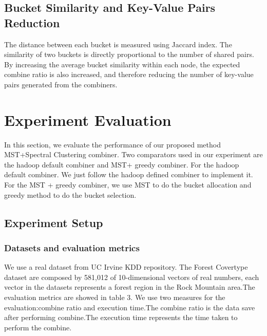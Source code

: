 \documentclass{vldb}
\begin{document}
\subsection{Bucket Similarity and Key-Value Pairs Reduction}
The distance between each bucket is measured using Jaccard index. The similarity of two buckets is directly proportional to the number of shared pairs. By increasing the average bucket similarity within each node, the expected combine ratio is also increased, and therefore reducing the number of key-value pairs generated from the combiners.
\section{Experiment Evaluation}
In this section, we evaluate the performance of our proposed method MST+Spectral Clustering combiner. Two comparators used in our experiment are the hadoop default combiner and MST+ greedy combiner. For the hadoop default combiner. We just follow the hadoop defined combiner to implement it. For the MST + greedy combiner, we use MST to do the bucket allocation and greedy method to do the bucket selection.
\subsection{Experiment Setup}
\subsubsection{Datasets and evaluation metrics}
We use a real dataset from UC Irvine KDD repository. The Forest Covertype dataset are composed by 581,012 of 10-dimensional vectors of real numbers, each vector in the datasets represents a forest region in the Rock Mountain area.The evaluation metrics are showed in table 3.
We use two measures for the evaluation:combine ratio and execution time.The combine ratio is the data save after performing combine.The execution time represents the time taken to perform the combine.
\end{document}
